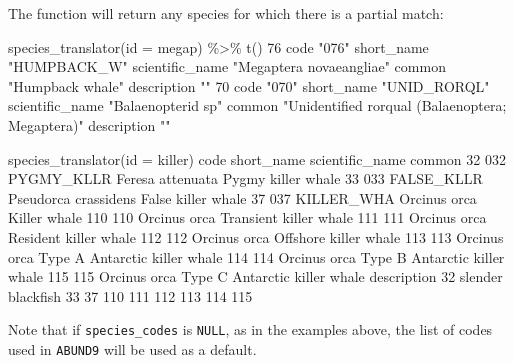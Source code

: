 \documentclass[
]{book}
\newenvironment{Shaded}{\begin{snugshade}}{\end{snugshade}}
\newcommand{\AttributeTok}[1]{\textcolor[rgb]{0.77,0.63,0.00}{#1}}
\newcommand{\DecValTok}[1]{\textcolor[rgb]{0.00,0.00,0.81}{#1}}
\newcommand{\FunctionTok}[1]{\textcolor[rgb]{0.00,0.00,0.00}{#1}}
\newcommand{\NormalTok}[1]{#1}
\newcommand{\SpecialCharTok}[1]{\textcolor[rgb]{0.00,0.00,0.00}{#1}}
\newcommand{\StringTok}[1]{\textcolor[rgb]{0.31,0.60,0.02}{#1}}
\begin{document}
The function will return any species for which there is a partial match:

\begin{Shaded}
\begin{Highlighting}[]
\FunctionTok{species\_translator}\NormalTok{(}\AttributeTok{id =} \StringTok{\textquotesingle{}megap\textquotesingle{}}\NormalTok{) }\SpecialCharTok{\%\textgreater{}\%} \FunctionTok{t}\NormalTok{()}
                \DecValTok{76}                      
\NormalTok{code            }\StringTok{"076"}                   
\NormalTok{short\_name      }\StringTok{"HUMPBACK\_W"}            
\NormalTok{scientific\_name }\StringTok{"Megaptera novaeangliae"}
\NormalTok{common          }\StringTok{"Humpback whale"}        
\NormalTok{description     }\StringTok{""}                      
                \DecValTok{70}                                              
\NormalTok{code            }\StringTok{"070"}                                           
\NormalTok{short\_name      }\StringTok{"UNID\_RORQL"}                                    
\NormalTok{scientific\_name }\StringTok{"Balaenopterid sp"}                              
\NormalTok{common          }\StringTok{"Unidentified rorqual (Balaenoptera; Megaptera)"}
\NormalTok{description     }\StringTok{""}                                              
\end{Highlighting}
\end{Shaded}

\begin{Shaded}
\begin{Highlighting}[]
\FunctionTok{species\_translator}\NormalTok{(}\AttributeTok{id =} \StringTok{\textquotesingle{}killer\textquotesingle{}}\NormalTok{)}
\NormalTok{    code short\_name      scientific\_name                        common}
\DecValTok{32}   \DecValTok{032}\NormalTok{ PYGMY\_KLLR     Feresa attenuata            Pygmy killer whale}
\DecValTok{33}   \DecValTok{033}\NormalTok{ FALSE\_KLLR Pseudorca crassidens            False killer whale}
\DecValTok{37}   \DecValTok{037}\NormalTok{ KILLER\_WHA         Orcinus orca                  Killer whale}
\DecValTok{110}  \DecValTok{110}\NormalTok{                    Orcinus orca        Transient killer whale}
\DecValTok{111}  \DecValTok{111}\NormalTok{                    Orcinus orca         Resident killer whale}
\DecValTok{112}  \DecValTok{112}\NormalTok{                    Orcinus orca         Offshore killer whale}
\DecValTok{113}  \DecValTok{113}\NormalTok{                    Orcinus orca Type A Antarctic killer whale}
\DecValTok{114}  \DecValTok{114}\NormalTok{                    Orcinus orca Type B Antarctic killer whale}
\DecValTok{115}  \DecValTok{115}\NormalTok{                    Orcinus orca Type C Antarctic killer whale}
\NormalTok{          description}
\DecValTok{32}\NormalTok{  slender blackfish}
\DecValTok{33}                   
\DecValTok{37}                   
\DecValTok{110}                  
\DecValTok{111}                  
\DecValTok{112}                  
\DecValTok{113}                  
\DecValTok{114}                  
\DecValTok{115}                  
\end{Highlighting}
\end{Shaded}

Note that if \texttt{species\_codes} is \texttt{NULL}, as in the examples above, the list of codes used in \texttt{ABUND9} will be used as a default.

  
\end{document}
